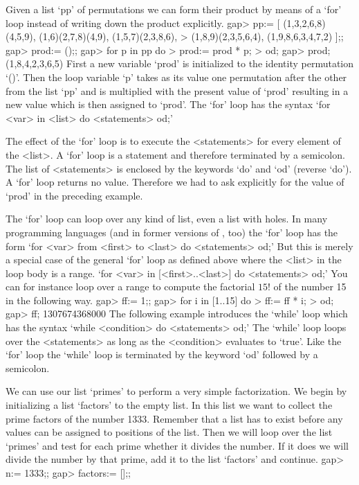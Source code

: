 %
Given a list `pp' of permutations we can form their product by means of a
`for' loop instead of writing down the product explicitly.
\beginexample
    gap> pp:= [ (1,3,2,6,8)(4,5,9), (1,6)(2,7,8)(4,9), (1,5,7)(2,3,8,6),
    >           (1,8,9)(2,3,5,6,4), (1,9,8,6,3,4,7,2) ];;
    gap> prod:= ();;
    gap> for p in pp do
    >       prod:= prod * p;
    >    od;
    gap> prod;
    (1,8,4,2,3,6,5)
\endexample
First a  new variable `prod'  is initialized  to the identity permutation
`()'. Then the loop variable `p' takes as its value one permutation after
the other from the list `pp' and is multiplied with  the present value of
`prod'  resulting in a  new value which  is then assigned  to `prod'. The
`for' loop has the syntax `for <var> in <list> do <statements> od;'

The  effect of the `for'  loop  is to execute the <statements> for  every
element  of  the <list>.   A `for'  loop  is  a  statement  and therefore
terminated by a semicolon.  The list of <statements>  is enclosed by  the
keywords `do' and `od'  (reverse  `do').  A `for'  loop returns no value.
Therefore we had  to  ask  explicitly for  the  value  of  `prod' in  the
preceding example.

The `for' loop can loop over any kind of list, even a list with holes. In
many programming languages (and  in former versions  of {\GAP},  too) the
`for' loop has the form `for <var> from <first> to <last> do <statements>
od;' But   this is merely  a special  case of  the general `for'  loop as
defined above where the <list> in the loop body is a range. `for <var> in
[<first>..<last>] do <statements>  od;' You can for  instance loop over a
range to compute the  factorial $15!$ of the  number 15 in the  following
way.
\beginexample
    gap> ff:= 1;;
    gap> for i in [1..15] do
    >       ff:= ff * i;
    >    od;
    gap> ff;
    1307674368000 
\endexample
The following  example introduces the  `while' loop which  has the syntax
`while <condition> do <statements>  od;' The `while'  loop loops over the
<statements>  as long as  the <condition> evaluates  to  `true'. Like the
`for' loop the `while' loop is terminated by the keyword `od' followed by
a semicolon.

We can use  our list `primes' to perform a very simple factorization.  We
begin by  initializing a list `factors' to the empty list.   In this list
we want to collect the prime factors of the number 1333.  Remember that a
list has to exist  before any values  can be assigned to positions of the
list.  Then we  will loop over the list `primes' and  test for each prime
whether it divides the  number.  If it does we will  divide the number by
that prime, add it to the list `factors' and continue.
\beginexample
    gap> n:= 1333;;
    gap> factors:= [];;

